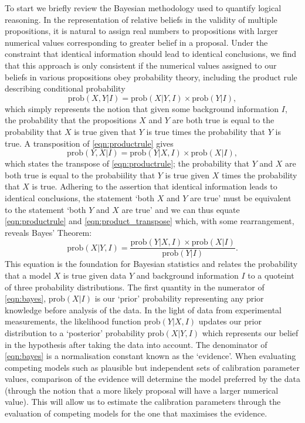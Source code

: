 To start we briefly review the Bayesian methodology used to quantify logical reasoning. In the representation of relative beliefs in the validity of multiple propositions, it is natural to assign real numbers to propositions with larger numerical values corresponding to greater belief in a proposal. Under the constraint that identical information should lead to identical conclusions, we find that this approach is only consistent if the numerical values assigned to our beliefs in various propositions obey probability theory, including the product rule describing conditional probability \citep{sivia_skilling}
\begin{equation}
    \mathrm{prob}(X,Y|I) = \mathrm{prob}(X|Y,I) \times \mathrm{prob}(Y|I),
    \label{eqn:productrule}
\end{equation}
which simply represents the notion that given some background information $I$, the probability that the propositions $X$ and $Y$ are both true is equal to the probability that $X$ is true given that $Y$ is true times the probability that $Y$ is true. A transposition of \cref{eqn:productrule} gives
\begin{equation}
    \mathrm{prob}(Y,X|I) = \mathrm{prob}(Y|X,I) \times \mathrm{prob}(X|I),
    \label{eqn:product_transpose}
\end{equation}
which states the transpose of \cref{eqn:productrule}; the probability that $Y$ and $X$ are both true is equal to the probabiility that $Y$ is true given $X$ times the probability that $X$ is true. Adhering to the assertion that identical information leads to identical conclusions, the statement ‘both $X$ and $Y$ are true’ must be equivalent to the statement ‘both $Y$ and $X$ are true’ and we can thus equate \cref{eqn:productrule} and \cref{eqn:product_transpose} which, with some rearrangement, reveals Bayes' Theorem:
\begin{equation}
    \mathrm{prob}(X|Y,I) = \frac{\mathrm{prob}(Y|X,I) \times \mathrm{prob}(X|I)}{\mathrm{prob}(Y|I)}.
    \label{eqn:bayes}
\end{equation}
This equation is the foundation for Bayesian statistics and relates the probability that a model $X$ is true given data $Y$ and background information $I$ to a quoteint of three probability distributions. The first quantity in the numerator of \cref{eqn:bayes}, $\mathrm{prob}(X|I)$ is our ‘prior’ probability representing any prior knowledge before analysis of the data. In the light of data from experimental measurements, the likelihood function $\mathrm{prob}(Y|X,I)$ updates our prior distribution to a ‘posterior’ probability $\mathrm{prob}(X|Y,I)$ which represents our belief in the hypothesis after taking the data into account. The denominator of \cref{eqn:bayes} is a normalisation constant known as the ‘evidence’. When evaluating competing models such as plausible but independent sets of calibration parameter values, comparison of the evidence will determine the model preferred by the data (through the notion that a more likely proposal will have a larger numerical value). This will allow us to estimate the calibration parameters through the evaluation of competing models for the one that maximises the evidence.


